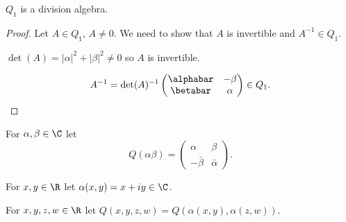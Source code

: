 \documentclass[oneside,12pt]{amsart}
\begin{document}
\begin{lemma}  $Q_1$ is a division algebra.
\end{lemma}
\begin{proof}
Let $A\in Q_1$, $A\not=0$. We need to show that $A$ is invertible and $A^{-1}\in Q_1$.

$\det(A) = |\alpha|^2 + |\beta|^2 \not = 0$ so $A$ is invertible.

$$A^{-1} = \det(A)^{-1} \begin{pmatrix}
\alphabar & -\beta \\
\betabar & \alpha
\end{pmatrix} \in Q_1.$$

\end{proof}


For $\alpha,\beta \in \C$ let 
$$Q(\alpha\beta) = \begin{pmatrix}
\alpha & \beta \\
-\bar{\beta} & \bar{\alpha}
\end{pmatrix}.$$

For $x,y\in\R$ let $\alpha(x,y) = x + iy\in\C$.

For $x,y,z,w\in\R$ let $Q(x,y,z,w) = Q(\alpha(x,y), \alpha(z,w))$.





\end{document}

